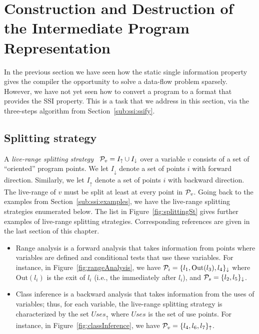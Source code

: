 {\section{Construction and Destruction of the Intermediate Program Representation}
\label{sec:building}
\def\Sdown{\downarrow}
\def\Sup{\uparrow}
\def\SS{{\cal P}}
\def\Out{\textrm{Out}}
\def\In{\textrm{In}}
\def\Defs{\textrm{Defs}}
\def\Def{\textrm{Def}}
\def\Uses{\textrm{Uses}}

In the previous section we have seen how the static single information
property gives the compiler the opportunity to solve a data-flow problem sparsely.
However, we have not yet seen how to convert a program to a format that provides the SSI property.
This is a task that we address in this section, via the three-steps algorithm from Section~\ref{sub:ssi:ssify}.

\subsection{Splitting strategy}
A {\em live-range splitting strategy} \
$\SS_v = I_\uparrow \cup I_\downarrow$ over a variable $v$ consists of a set
of ``oriented'' program points.
We let $I_\downarrow$ denote a set of points $i$ with forward direction.
Similarly, we let $I_\uparrow$ denote a set of points $i$ with backward
direction.
The live-range of $v$ must be split at least at every point in $\SS_v$.
Going back to the examples from Section~\ref{sub:ssi:examples}, we have the live-range splitting strategies enumerated below.
The list in Figure~\ref{fig:splittingSt} gives further examples of live-range splitting strategies. Corresponding references are given in the last section of this chapter.

\begin{itemize}
  \item Range analysis is a forward 
    analysis that takes information from points where variables are defined and 
    conditional tests that use these variables.
For instance, in Figure~\ref{fig:rangeAnalysis}, we have $\SS_{i} = \{l_1, 
\Out(l_3), l_4\}_\downarrow$ where $\Out(l_i)$ is the exit of $l_i$ (i.e., the 
\progpoint immediately after $l_i$), and $\SS_{s}=\{l_2, l_5\}_\downarrow$.

\item Class inference is a backward analysis that takes 
  information from the uses of variables; thus, for each variable, the 
  live-range splitting strategy is characterized by the set 
  $\textit{Uses}_\uparrow$ where $\textit{Uses}$ is the set of use points.
For instance, in Figure~\ref{fig:classInference}, we have $\SS_{v} = \{l_4, 
l_6,l_7\}_\uparrow$.



\end{itemize}}
